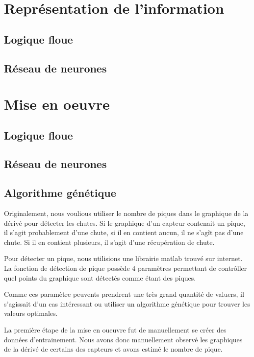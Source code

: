 \documentclass[12pt,letterpaper]{article}
\begin{document}
\section{Représentation de l'information}

\subsection{Logique floue}

\subsection{Réseau de neurones}

\section{Mise en oeuvre}

\subsection{Logique floue}

\subsection{Réseau de neurones}

\subsection{Algorithme génétique}

Originalement, nous voulious utiliser le nombre de piques dans le graphique de la dérivé pour détecter les chutes.
Si le graphique d'un capteur contenait un pique, il s'agit probablement d'une chute, si il en contient aucun, il 
ne s'agît pas d'une chute. Si il en contient plusieurs, il s'agit d'une récupération de chute. 

Pour détecter un pique, nous utilisions une librairie matlab trouvé sur internet. La fonction de détection de pique
possède 4 paramètres permettant de contrôller quel points du graphique sont détectés comme étant des piques. 

Comme ces paramètre peuvents prendrent une très grand quantité de valuers, il s'agissait d'un cas intéressant ou utiliser
un algorithme génétique pour trouver les valeurs optimales. 

La première étape de la mise en oueuvre fut de manuellement se créer des données d'entrainement. Nous avons donc manuellement
observé les graphiques de la dérivé de certains des capteurs et avons estimé le nombre de pique. 
\end{document}
